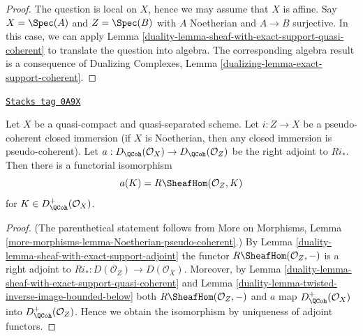 \begin{proof}

The question is local on $X$, hence we may assume that $X$ is affine.
Say $X = \Spec(A)$ and $Z = \Spec(B)$ with $A$ Noetherian and
$A \to B$ surjective. In this case, we can apply
Lemma \ref{duality-lemma-sheaf-with-exact-support-quasi-coherent}
to translate the question into algebra.
The corresponding algebra result is a consequence of
Dualizing Complexes, Lemma \ref{dualizing-lemma-exact-support-coherent}.
\end{proof}

\begin{lemma}
\label{duality-lemma-twisted-inverse-image-closed}
\href{https://stacks.math.columbia.edu/tag/0A9X}{\texttt{Stacks tag 0A9X}}

Let $X$ be a quasi-compact and quasi-separated scheme.
Let $i : Z \to X$ be a pseudo-coherent closed immersion
(if $X$ is Noetherian, then any closed immersion is pseudo-coherent).
Let $a : D_\QCoh(\mathcal{O}_X) \to D_\QCoh(\mathcal{O}_Z)$ be the
right adjoint to $Ri_*$. Then there is a functorial isomorphism
$$
a(K) = R\SheafHom(\mathcal{O}_Z, K)
$$
for $K \in D_\QCoh^+(\mathcal{O}_X)$.
\end{lemma}

\begin{proof}

(The parenthetical statement follows from More on Morphisms, Lemma
\ref{more-morphisms-lemma-Noetherian-pseudo-coherent}.)
By Lemma \ref{duality-lemma-sheaf-with-exact-support-adjoint}
the functor $R\SheafHom(\mathcal{O}_Z, -)$ is a right adjoint
to $Ri_* : D(\mathcal{O}_Z) \to D(\mathcal{O}_X)$. Moreover,
by Lemma \ref{duality-lemma-sheaf-with-exact-support-quasi-coherent}
and Lemma \ref{duality-lemma-twisted-inverse-image-bounded-below}
both $R\SheafHom(\mathcal{O}_Z, -)$ and $a$ map
$D_\QCoh^+(\mathcal{O}_X)$ into $D_\QCoh^+(\mathcal{O}_Z)$.
Hence we obtain the isomorphism by uniqueness of adjoint
functors.
\end{proof}

